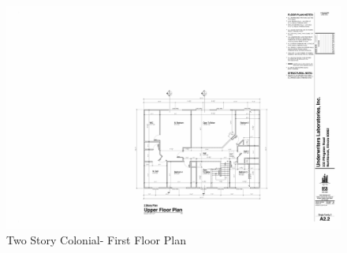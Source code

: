 \documentclass{article}
\begin{document}
\begin{appendices}
\clearpage

\begin{figure}
	\includegraphics[width = 7.25in]{0_Images/Construction_Drawings/2_Story_Floor_Plan_Upper.pdf}
	\caption{Two Story Colonial- First Floor Plan}
\end{figure}

\end{appendices}
\end{document}
